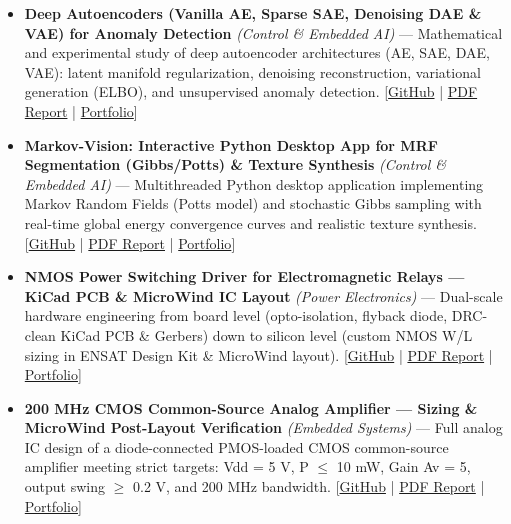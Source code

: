 \documentclass[10pt,a4paper]{article}
\begin{document}
\begin{itemize}
\item \textbf{Deep Autoencoders (Vanilla AE, Sparse SAE, Denoising DAE \& VAE) for Anomaly Detection} \textit{(Control \& Embedded AI)} --- Mathematical and experimental study of deep autoencoder architectures (AE, SAE, DAE, VAE): latent manifold regularization, denoising reconstruction, variational generation (ELBO), and unsupervised anomaly detection. [\href{https://github.com/scidelo-andriasahy/deep-autoencoders-anomaly-detection-vae}{GitHub} | \href{https://scidelo-andriasahy.github.io/assets/pdfs/Rapport_Autoencodeurs_IA_EN.pdf}{PDF Report} | \href{https://scidelo-andriasahy.github.io/?project=10}{Portfolio}]
\item \textbf{Markov-Vision: Interactive Python Desktop App for MRF Segmentation (Gibbs/Potts) \& Texture Synthesis} \textit{(Control \& Embedded AI)} --- Multithreaded Python desktop application implementing Markov Random Fields (Potts model) and stochastic Gibbs sampling with real-time global energy convergence curves and realistic texture synthesis. [\href{https://github.com/scidelo-andriasahy/markov-vision}{GitHub} | \href{https://scidelo-andriasahy.github.io/assets/pdfs/Rapport_Markov_Vision.pdf}{PDF Report} | \href{https://scidelo-andriasahy.github.io/?project=11}{Portfolio}]
\item \textbf{NMOS Power Switching Driver for Electromagnetic Relays --- KiCad PCB \& MicroWind IC Layout} \textit{(Power Electronics)} --- Dual-scale hardware engineering from board level (opto-isolation, flyback diode, DRC-clean KiCad PCB \& Gerbers) down to silicon level (custom NMOS W/L sizing in ENSAT Design Kit \& MicroWind layout). [\href{https://github.com/scidelo-andriasahy/nmos-power-relay-driver-kicad-microwind}{GitHub} | \href{https://scidelo-andriasahy.github.io/assets/pdfs/Rapport_Interface_NMOS_Relais_EN.pdf}{PDF Report} | \href{https://scidelo-andriasahy.github.io/?project=12}{Portfolio}]
\item \textbf{200 MHz CMOS Common-Source Analog Amplifier --- Sizing \& MicroWind Post-Layout Verification} \textit{(Embedded Systems)} --- Full analog IC design of a diode-connected PMOS-loaded CMOS common-source amplifier meeting strict targets: Vdd = 5 V, P $\leq$ 10 mW, Gain Av = 5, output swing $\geq$ 0.2 V, and 200 MHz bandwidth. [\href{https://github.com/scidelo-andriasahy/cmos-common-source-amplifier-200mhz-microwind}{GitHub} | \href{https://scidelo-andriasahy.github.io/assets/pdfs/Rapport_Amplificateur_CMOS_200MHz_EN.pdf}{PDF Report} | \href{https://scidelo-andriasahy.github.io/?project=13}{Portfolio}]

\end{itemize}
\end{document}
